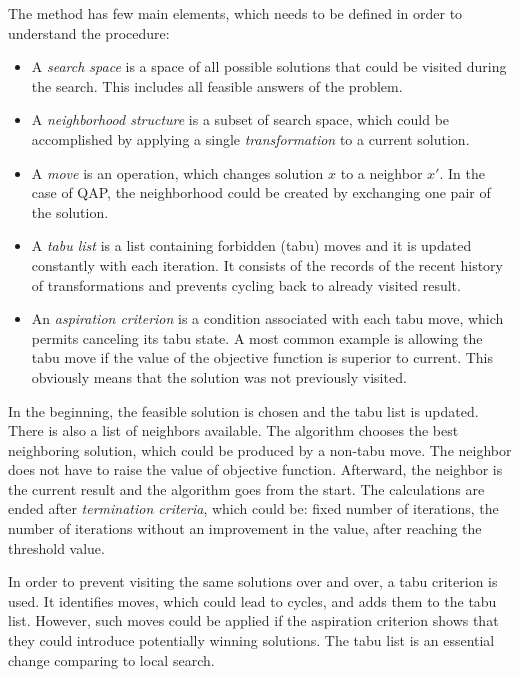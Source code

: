 The method has few main elements, which needs to be defined in order to understand the procedure:
\begin{itemize}
  \item A \textit{search space} is a space of all possible solutions that could be visited during the search. This includes all feasible answers of the problem.
  \item A \textit{neighborhood structure} is a subset of search space, which could be accomplished by applying a single \textit{transformation} to a current solution.
  \item A \textit{move} is an operation, which changes solution $x$ to a neighbor $x'$. In the case of QAP, the neighborhood could be created by exchanging one pair of the solution.
  \item A \textit{tabu list} is a list containing forbidden (tabu) moves and it is updated constantly with each iteration. It consists of the records of the recent history of transformations and prevents cycling back to already visited result.
  \item An \textit{aspiration criterion} is a condition associated with each tabu move, which permits canceling its tabu state. A most common example is allowing the tabu move if the value of the objective function is superior to current. This obviously means that the solution was not previously visited.
\end{itemize}

In the beginning, the feasible solution is chosen and the tabu list is updated.
There is also a list of neighbors available.
The algorithm chooses the best neighboring solution, which could be produced by a non-tabu move.
The neighbor does not have to raise the value of objective function.
Afterward, the neighbor is the current result and the algorithm goes from the start.
The calculations are ended after \textit{termination criteria}, which could be: fixed number of iterations, the number of iterations without an improvement in the value, after reaching the threshold value.

In order to prevent visiting the same solutions over and over, a tabu criterion is used.
It identifies moves, which could lead to cycles, and adds them to the tabu list.
However, such moves could be applied if the aspiration criterion shows that they could introduce potentially winning solutions.
The tabu list is an essential change comparing to local search.

